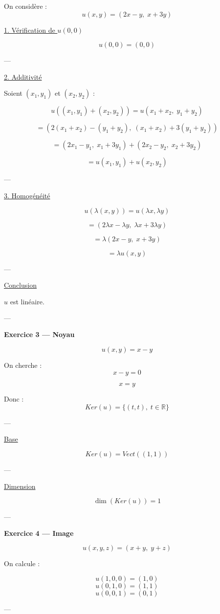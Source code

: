 \documentclass[11pt,a4paper]{article}
\begin{document}
On considère :
\[
u(x,y) = (2x - y,\; x + 3y)
\]

\underline{1. Vérification de $u(0,0)$}

\[
u(0,0) = (0,0)
\]

---

\underline{2. Additivité}

Soient $(x_1,y_1)$ et $(x_2,y_2)$ :

\[
u((x_1,y_1)+(x_2,y_2))
= u(x_1+x_2,\; y_1+y_2)
\]

\[
= (2(x_1+x_2)-(y_1+y_2),\; (x_1+x_2)+3(y_1+y_2))
\]

\[
= (2x_1-y_1,\; x_1+3y_1) + (2x_2-y_2,\; x_2+3y_2)
\]

\[
= u(x_1,y_1) + u(x_2,y_2)
\]

---

\underline{3. Homogénéité}

\[
u(\lambda(x,y)) = u(\lambda x, \lambda y)
\]

\[
= (2\lambda x - \lambda y,\; \lambda x + 3\lambda y)
\]

\[
= \lambda (2x-y,\; x+3y)
\]

\[
= \lambda u(x,y)
\]

---

\underline{Conclusion}

$u$ est linéaire.

---

\textbf{Exercice 3 — Noyau}

\[
u(x,y) = x-y
\]

On cherche :
\[
x-y=0
\]

\[
x=y
\]

Donc :
\[
Ker(u) = \{(t,t),\; t \in \mathbb{R}\}
\]

---

\underline{Base}

\[
Ker(u) = Vect((1,1))
\]

---

\underline{Dimension}

\[
\dim(Ker(u)) = 1
\]

---

\textbf{Exercice 4 — Image}

\[
u(x,y,z) = (x+y,\; y+z)
\]

On calcule :

\[
u(1,0,0) = (1,0)
\]
\[
u(0,1,0) = (1,1)
\]
\[
u(0,0,1) = (0,1)
\]

---
\end{document}
